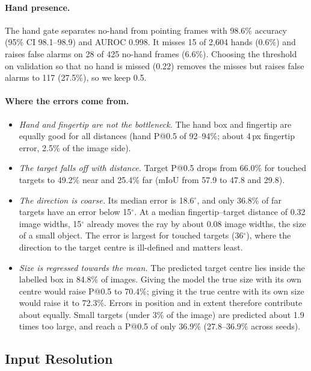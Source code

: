 \paragraph{Hand presence.} The hand gate separates no-hand from pointing frames with 98.6\% accuracy (95\% CI 98.1--98.9) and AUROC 0.998. It misses 15 of 2,604 hands (0.6\%) and raises false alarms on 28 of 425 no-hand frames (6.6\%). Choosing the threshold on validation so that no hand is missed (0.22) removes the misses but raises false alarms to 117 (27.5\%), so we keep 0.5.

\paragraph{Where the errors come from.}
\begin{itemize}
\item \emph{Hand and fingertip are not the bottleneck.} The hand box and fingertip are equally good for all distances (hand P@0.5 of 92--94\%; about 4\,px fingertip error, 2.5\% of the image side).
\item \emph{The target falls off with distance.} Target P@0.5 drops from 66.0\% for touched targets to 49.2\% near and 25.4\% far (mIoU from 57.9 to 47.8 and 29.8).
\item \emph{The direction is coarse.} Its median error is 18.6$^\circ$, and only 36.8\% of far targets have an error below 15$^\circ$. At a median fingertip--target distance of 0.32 image widths, 15$^\circ$ already moves the ray by about 0.08 image widths, the size of a small object. The error is largest for touched targets (36$^\circ$), where the direction to the target centre is ill-defined and matters least.
\item \emph{Size is regressed towards the mean.} The predicted target centre lies inside the labelled box in 84.8\% of images. Giving the model the true size with its own centre would raise P@0.5 to 70.4\%; giving it the true centre with its own size would raise it to 72.3\%. Errors in position and in extent therefore contribute about equally. Small targets (under 3\% of the image) are predicted about 1.9 times too large, and reach a P@0.5 of only 36.9\% (27.8--36.9\% across seeds).
\end{itemize}

\subsection{Input Resolution}\label{sec:resolution}

